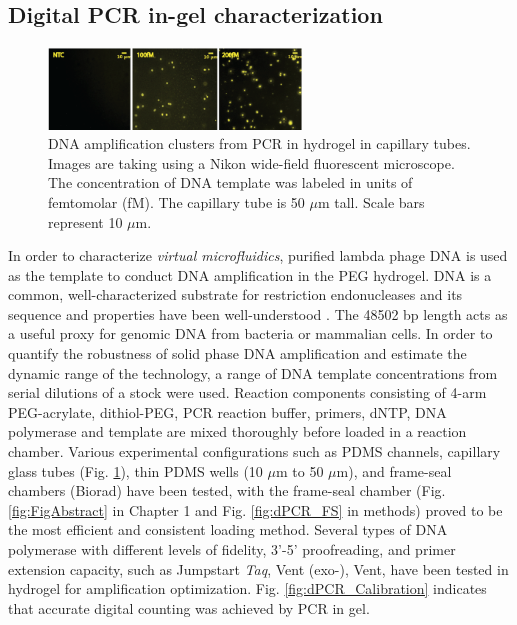 \subsection{Digital PCR in-gel characterization}

\begin{figure} 
\centering
\includegraphics[keepaspectratio,width=0.6\textwidth]{./figures/dPCR_Capillary.png}
\caption[DNA amplification clusters from PCR in hydrogel in capillary tubes.]{DNA amplification clusters from PCR in hydrogel in capillary tubes. Images are taking using a Nikon wide-field fluorescent microscope. The concentration of DNA template was labeled in units of femtomolar (fM). The capillary tube is 50 $\mu$m tall. Scale bars represent 10 $\mu$m.}
\label{fig:dPCR_Cap}
\end{figure}

In order to characterize \textit{virtual microfluidics}, purified lambda phage DNA is used as the template to conduct DNA amplification in the PEG hydrogel. \textlambda DNA is a common, well-characterized substrate for restriction endonucleases and its sequence and properties have been well-understood \cite{Fu:2011wc, Robertson:2006gi}. The 48502 bp length acts as a useful proxy for genomic DNA from bacteria or mammalian cells. In order to quantify the robustness of solid phase DNA amplification and estimate the dynamic range of the technology, a range of DNA template concentrations from serial dilutions of a stock were used. Reaction components consisting of 4-arm PEG-acrylate, dithiol-PEG, PCR reaction buffer, primers, dNTP, DNA polymerase and template are mixed thoroughly before loaded in a reaction chamber. Various experimental configurations such as PDMS channels, capillary glass tubes (Fig. \ref{fig:dPCR_Cap}), thin PDMS wells (10 $\mu$m to 50 $\mu$m), and frame-seal chambers (Biorad) have been tested, with the frame-seal chamber (Fig. \ref{fig:FigAbstract} in Chapter 1 and Fig. \ref{fig:dPCR_FS} in methods) proved to be the most efficient and consistent loading method. Several types of DNA polymerase with different levels of fidelity, 3'-5' proofreading, and primer extension capacity, such as Jumpstart \textit{Taq}, Vent (exo-), Vent, have been tested in hydrogel for amplification optimization. Fig. \ref{fig:dPCR_Calibration} indicates that accurate digital counting was achieved by PCR in gel. 

